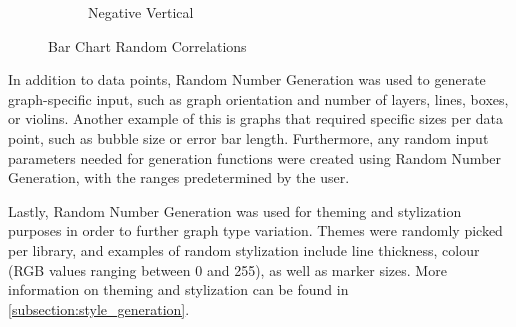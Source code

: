 \begin{figure}
\begin{subfigure}[b]{0.24\textwidth}
        \caption{Negative Vertical}
        \label{figure:neg_error}
    \end{subfigure}
    \caption{Bar Chart Random Correlations}
    \label{figure:bar_correlations}
\end{figure}

In addition to data points, Random Number Generation was used to generate graph-specific input, such as graph orientation and number of layers, lines, boxes, or violins. Another example of this is graphs that required specific sizes per data point, such as bubble size or error bar length. Furthermore, any random input parameters needed for generation functions were created using Random Number Generation, with the ranges predetermined by the user.

\hfill

Lastly, Random Number Generation was used for theming and stylization purposes in order to further graph type variation. Themes were randomly picked per library, and examples of random stylization include line thickness, colour (RGB values ranging between 0 and 255), as well as marker sizes. More information on theming and stylization can be found in \autoref{subsection:style_generation}.